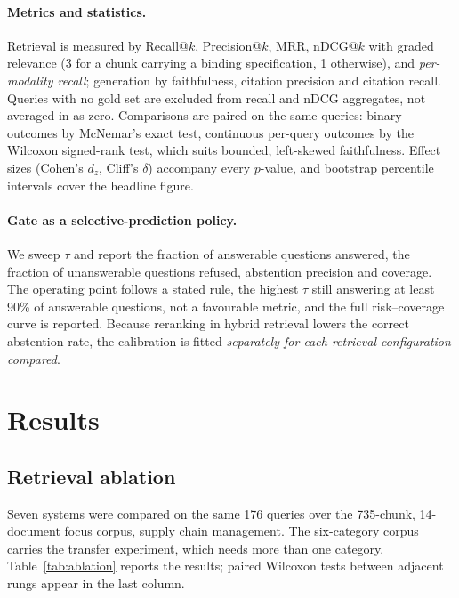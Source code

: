 \documentclass[conference]{IEEEtran}
\begin{document}
\paragraph{Metrics and statistics.} Retrieval is measured by Recall@$k$,
Precision@$k$, MRR, nDCG@$k$ with graded relevance
(3 for a chunk carrying a binding specification, 1 otherwise), and
\emph{per-modality recall}; generation by faithfulness, citation precision
and citation recall. Queries with no gold set are excluded from recall and
nDCG aggregates, not averaged in as zero. Comparisons are paired on the same
queries: binary outcomes by McNemar's exact test, continuous per-query
outcomes by the Wilcoxon signed-rank test, which suits bounded, left-skewed
faithfulness. Effect sizes (Cohen's $d_z$, Cliff's $\delta$) accompany every
$p$-value, and bootstrap percentile intervals cover the headline figure.

\paragraph{Gate as a selective-prediction policy.} We sweep $\tau$ and report
the fraction of answerable questions answered, the fraction of unanswerable
questions refused, abstention precision and coverage. The operating point
follows a stated rule, the highest $\tau$ still answering
at least 90\% of answerable questions, not a favourable metric, and the full
risk--coverage curve is reported. Because reranking in hybrid retrieval
lowers the correct abstention rate, the calibration is fitted
\emph{separately for each retrieval configuration compared}.

\section{Results}

\subsection{Retrieval ablation}

Seven systems were compared on the same 176 queries over the
735-chunk, 14-document focus corpus,
supply chain management. The six-category corpus carries the transfer
experiment, which needs more than one category. Table~\ref{tab:ablation} reports
the results; paired Wilcoxon tests between adjacent rungs appear in the last
column.
\end{document}
